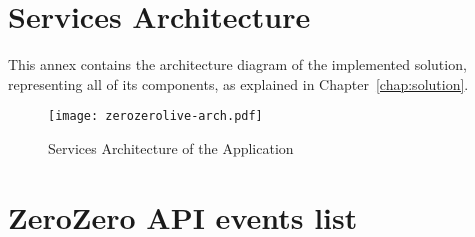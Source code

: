 \chapter{Services Architecture} \label{ap1:annex-high-level-arch}

This annex contains the architecture diagram of the implemented solution, representing all of its components, as explained in Chapter~\ref{chap:solution}.

\begin{landscape}
    \begin{figure}
       \centering
        \texttt{[image: zerozerolive-arch.pdf]}
        \caption{Services Architecture of the Application}
        \label{fig:annex-high-level-arch}
    \end{figure}
    \end{landscape}

\chapter{ZeroZero API events list} \label{annex:api-events}


